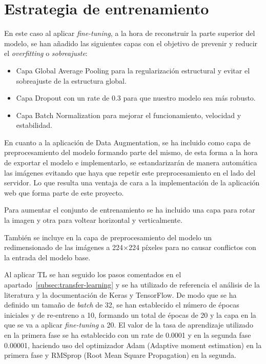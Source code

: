 \section{Estrategia de entrenamiento}\label{sec:estrategia-de-entrenamiento}
En este caso al aplicar \textit{fine-tuning}, a la hora de reconstruir la parte superior del modelo, se han añadido las
siguientes capas con el objetivo de prevenir y reducir el \textit{overfitting} o \textit{sobreajuste}:
\begin{itemize}
    \item Capa Global Average Pooling para la regularización estructural y evitar el sobreajuste de la estructura global.
    \item Capa Dropout con un  rate de 0.3 para que nuestro modelo sea más robusto.
    \item Capa Batch Normalization para mejorar el funcionamiento, velocidad y estabilidad. \\
\end{itemize}

En cuanto a la aplicación de Data Augmentation, se ha incluido como capa de preprocesamiento del modelo formando parte
del mismo, de esta forma a la hora de exportar el modelo e implementarlo, se estandarizarán de manera automática las
imágenes evitando que haya que repetir este preprocesamiento en el lado del servidor.
Lo que resulta una ventaja de cara a la implementación de la aplicación web que forma parte de este proyecto.

Para aumentar el conjunto de entrenamiento se ha incluido una capa para rotar la imagen y otra para voltear horizontal
y verticalmente.

También se incluye en la capa de preprocesamiento del modelo un redimensionado de las imágenes a 224×224 píxeles para
no causar conflictos con la entrada del modelo base.

Al aplicar TL se han seguido los pasos comentados en el apartado~\ref{subsec:transfer-learning} y se ha utilizado de
referencia el análisis de la literatura y la documentación de Keras y TensorFlow.
De modo que se ha definido un tamaño de \textit{batch} de 32, se han establecido el número de épocas iniciales y de re-entreno
a 10, formando un total de épocas de 20 y la capa en la que se va a aplicar \textit{fine-tuning} a 20.
El valor de la tasa de aprendizaje utilizado en la primera fase se ha establecido con un rate de 0.0001 y en la segunda
fase 0.00001, haciendo uso del optimizador Adam (Adaptive moment estimation) en la primera fase y
RMSprop (Root Mean Square Propagation) en la segunda.



